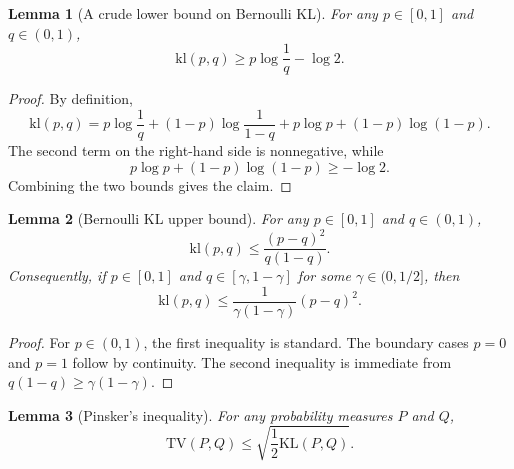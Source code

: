 \documentclass[
  12pt]{article}
\newtheorem{lemma}{Lemma}
\begin{document}
\begin{lemma}[A crude lower bound on Bernoulli KL]
\label{lem:bernoulli-kl-lower}
For any $p\in[0,1]$ and $q\in(0,1)$,
\[
\mathrm{kl}(p,q)\ge p\log\frac1q-\log 2.
\]
\end{lemma}

\begin{proof}
By definition,
\[
\mathrm{kl}(p,q)
=
p\log\frac1q+(1-p)\log\frac1{1-q}+p\log p+(1-p)\log(1-p).
\]
The second term on the right-hand side is nonnegative, while
\[
p\log p+(1-p)\log(1-p)\ge -\log 2.
\]
Combining the two bounds gives the claim.
\end{proof}

\begin{lemma}[Bernoulli KL upper bound]
\label{lem:bernoulli-kl-upper}
For any $p\in[0,1]$ and $q\in(0,1)$,
\[
\mathrm{kl}(p,q)\le \frac{(p-q)^2}{q(1-q)}.
\]
Consequently, if $p\in[0,1]$ and $q\in[\gamma,1-\gamma]$ for some
$\gamma\in(0,1/2]$, then
\[
\mathrm{kl}(p,q)\le \frac{1}{\gamma(1-\gamma)}(p-q)^2.
\]
\end{lemma}

\begin{proof}
For $p\in(0,1)$, the first inequality is standard. The boundary cases
$p=0$ and $p=1$ follow by continuity. The second inequality is immediate from
$q(1-q)\ge \gamma(1-\gamma)$.
\end{proof}

\begin{lemma}[Pinsker's inequality]
\label{lem:pinsker}
For any probability measures $P$ and $Q$,
\[
\mathrm{TV}(P,Q)\le \sqrt{\frac12 \mathrm{KL}(P,Q)}.
\]
\end{lemma}
\end{document}
